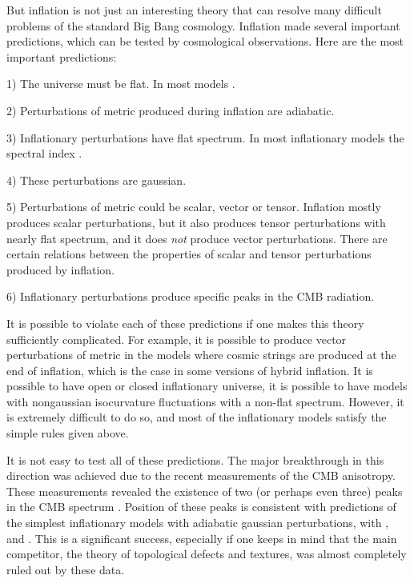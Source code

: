 \documentclass[a4paper,12pt]{article}
\begin{document}
But inflation is not just an interesting theory that can resolve many difficult problems of the standard Big Bang cosmology. Inflation made several important predictions, which can be tested by cosmological observations. Here are the most important predictions: 

1) The universe must be flat. In most models \coordHE{}.

2) Perturbations of metric produced during inflation are adiabatic.  

3) Inflationary perturbations have flat spectrum.  In most inflationary models the spectral index  \coordHE{}.

4) These perturbations are gaussian.  

5) Perturbations of metric could be scalar, vector or tensor. Inflation mostly produces scalar perturbations, but it also produces tensor perturbations with nearly flat spectrum, and it does {\it not} produce vector perturbations. There are certain relations between the properties of  scalar and tensor perturbations produced by inflation.

6) Inflationary perturbations produce specific peaks in the CMB radiation.

It is possible to violate each of these predictions if one makes this theory sufficiently complicated. For example, it is possible to produce vector perturbations of metric in the models where  cosmic strings are produced at the end of inflation, which is the case in some versions of hybrid inflation. It is possible to have open or closed inflationary universe, it is possible to have models with nongaussian isocurvature fluctuations with a non-flat spectrum. However, it is extremely difficult to do so, and most of the inflationary models satisfy the simple rules given above.  

It is not easy to test all of these predictions. The major breakthrough in this direction was achieved due to the recent measurements of the CMB anisotropy. These measurements revealed the existence of two (or perhaps even three) peaks in the CMB spectrum \cite{CMB}. Position of these peaks is consistent with predictions of the simplest inflationary models with adiabatic gaussian perturbations, with \coordHE{}, and \coordHE{} \cite{Lang}. This is a significant success, especially if one keeps in mind that the main competitor, the theory of topological defects and textures, was almost completely ruled out by these data.
\end{document}
